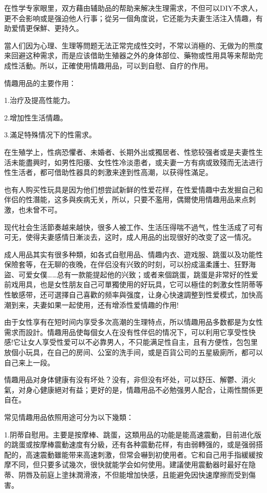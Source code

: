 \documentclass[12pt,UTF8]{ctexbook}
\begin{document}
在性学专家眼里，双方藉由辅助品的帮助来解决生理需求，不但可以DIY不求人，更不会影响或是强迫他人行事；從另一個角度说，它还能为夫妻生活注入情趣，有助爱情更保鮮、更持久。

當人们因为心理、生理等問题无法正常完成性交时，不常以消極的、无做为的熊度来回避这种需求，而是应该借助生殖器之外的身体部位、藥物或性用具等来帮助完成性活動。所以，正確使用情趣用品，可以到自慰、自疗的作用。

情趣用品的主要作用：

1.治疗及提高性能力。

2.增加性生活情趣。

3.滿足特殊情况下的性需求。

在生殖学上，性病恐懼者、未婚者、长期外出或獨居者、性慾较强者或是夫妻性生活未能盡興时，如男性阳痿、女性性冷淡患者，或夫妻一方有病或致殘而无法进行性生活者，都可借助性器具的刺激来達到性高潮，以获得性滿足。

也有人购买性玩具是因为他们想尝試新鲜的性爱花样，在性爱情趣中去发掘自己和伴侣的性潛能，这多與疾病无关，所以，只要不濫用，偶爾使用情趣用品来点刺激，也未曾不可。

现代社会生活節奏越来越快，很多人被工作、生活压得喘不過气，性生活成了可有可无，使得夫妻感情日漸淡去，这时，成人用品的出现很好的改变了这一情况。

成人用品其实有很多种類，如各式自慰用品、情趣内衣、遊戏服、跳蛋以及功能性保險套等，在无聊的夜晚，在伴侣没有兴致的时刻，可以扮成溫柔護士、狂野海盜、可爱女僕……总有一款能提起他的兴致；或者来個跳蛋，跳蛋是非常好的性爱前戏用具，也是女性朋友自己可單獨使用的好玩具，它可以極佳的刺激女性阴蒂等性敏感带，还可選擇自己喜歡的频率與强度，让身心快速調整到性爱模式，加快高潮到来，夫妻如果一起使用，还有增添性爱情趣的作用!

由于女性享有在短时间内享受多次高潮的生理特点，所以情趣用品多数都是为女性需求而設計。情趣用品使每個女人在没有性伴侣的情况下，可以利用它享受性快感!它让女人享受性爱可以不必靠男人，不只能满足性自主，且有方便性，包包里放個小玩具，在自己的房间、公室的洗手间，或是百貨公司的五星級廁所，都可以自己来上一段。

情趣用品对身体健康有没有坏处？没有，非但没有坏处，可以舒压、解鬱、消火氣，对身心健康絕对有益；更好的是，情趣用品不必勉强男人配合，让兩性關係更自在。

常见情趣用品依照用途可分为以下幾類：

1.阴蒂自慰用。主要是按摩棒、跳蛋，这類用品的功能是能高速震動，目前进化版的跳蛋或按摩棒震動速度有分級，还有各种震動花样，有由弱轉强的，或是强弱搭配的，高速震動雖能带来高速刺激，但常会嚇到初使用者。它和自己用手指緩緩按摩不同，但只要多试幾次，很快就能学会如何使用。建議使用震動器时最好在隐蒂、阴唇及前庭上塗抹潤滑液，不但能增加快感，且能避免因快速摩擦而受到傷害。
\end{document}
